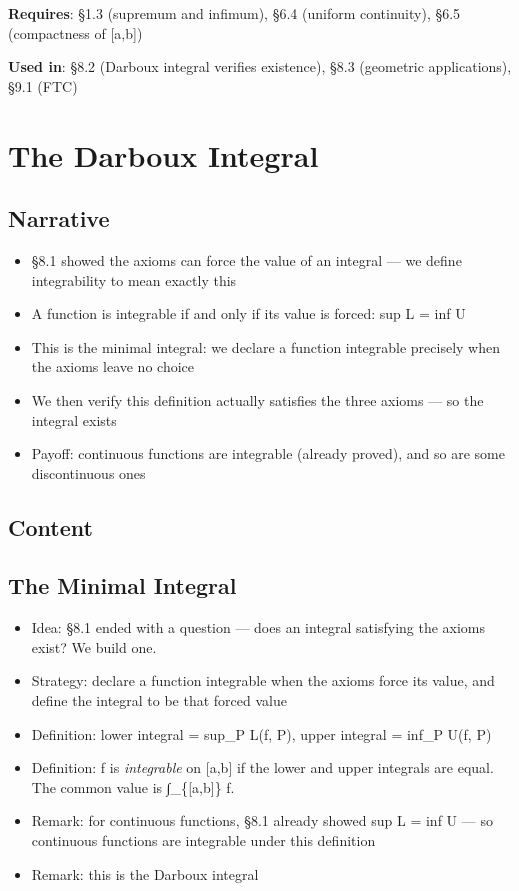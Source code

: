 \documentclass[
  10pt,
  letterpaper,
]{scrbook}
\providecommand{\tightlist}{%
  \setlength{\itemsep}{0pt}\setlength{\parskip}{0pt}}
\begin{document}
\textbf{Requires}: §1.3 (supremum and infimum), §6.4 (uniform
continuity), §6.5 (compactness of {[}a,b{]})

\textbf{Used in}: §8.2 (Darboux integral verifies existence), §8.3
(geometric applications), §9.1 (FTC)

\section{The Darboux Integral}\label{the-darboux-integral}

\subsection{Narrative}\label{narrative-35}

\begin{itemize}
\tightlist
\item
  §8.1 showed the axioms can force the value of an integral --- we
  define integrability to mean exactly this
\item
  A function is integrable if and only if its value is forced: sup L =
  inf U
\item
  This is the minimal integral: we declare a function integrable
  precisely when the axioms leave no choice
\item
  We then verify this definition actually satisfies the three axioms ---
  so the integral exists
\item
  Payoff: continuous functions are integrable (already proved), and so
  are some discontinuous ones
\end{itemize}

\subsection{Content}\label{content-35}

\subsection{The Minimal Integral}\label{the-minimal-integral}

\begin{itemize}
\tightlist
\item
  Idea: §8.1 ended with a question --- does an integral satisfying the
  axioms exist? We build one.
\item
  Strategy: declare a function integrable when the axioms force its
  value, and define the integral to be that forced value
\item
  Definition: lower integral = sup\_P L(f, P), upper integral = inf\_P
  U(f, P)
\item
  Definition: f is \emph{integrable} on {[}a,b{]} if the lower and upper
  integrals are equal. The common value is ∫\_\{{[}a,b{]}\} f.
\item
  Remark: for continuous functions, §8.1 already showed sup L = inf U
  --- so continuous functions are integrable under this definition
\item
  Remark: this is the Darboux integral
\end{itemize}
\end{document}
